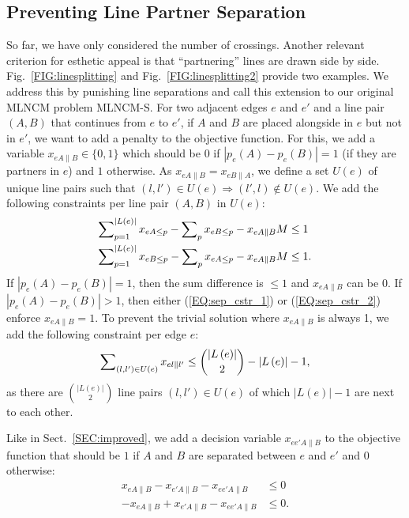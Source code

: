 \documentclass[sigconf]{acmart}
\begin{document}
\subsection{Preventing Line Partner Separation}\label{SEC:separation}

So far, we have only considered the number of crossings.
Another relevant criterion for esthetic appeal is that ``partnering'' lines are drawn side by side.
Fig.~\ref{FIG:linesplitting} and Fig.~\ref{FIG:linesplitting2} provide two examples. We address this by punishing line separations and call this extension to our original MLNCM problem \mbox{MLNCM-S}. For two adjacent edges $e$ and $e'$ and a line pair $(A, B)$ that continues from $e$ to $e'$, if $A$ and $B$ are placed alongside in $e$ but not in $e'$, we want to add a penalty to the objective function. For this, we add a variable $x_{eA\|B} \in \{0, 1\}$ which should be $0$ if $\left|p_{e}(A) - p_{e}(B)\right| = 1$ (if they are partners in $e$) and $1$ otherwise. As $x_{eA\|B} = x_{eB\|A}$, we define a set $U(e)$ of unique line pairs such that $(l, l') \in U(e) \Rightarrow (l', l) \not\in U(e)$. We add the following constraints per line pair $(A, B)$ in $U(e)$:
\begin{align}
	\sum\nolimits_{p=1}^{\left|L\left(e\right)\right|} x_{eA\leq p} - \sum\nolimits_{p} x_{eB\leq p} - x_{eA\|B} M &\leq 1 \label{EQ:sep_cstr_1} \\
	\sum\nolimits_{p=1}^{\left|L\left(e\right)\right|} x_{eB\leq p} - \sum\nolimits_{p} x_{eA\leq p} - x_{eA\|B} M &\leq 1. \label{EQ:sep_cstr_2}
\end{align}
If $|p_{e}(A) - p_{e}(B)| = 1$, then the sum difference is $\leq 1$ and $x_{eA\|B}$ can be 0. If $|p_{e}(A) - p_{e}(B)| > 1$, then either (\ref{EQ:sep_cstr_1}) or (\ref{EQ:sep_cstr_2}) enforce $x_{eA\|B} = 1$. To prevent the trivial solution where $x_{eA\|B}$ is always 1, we add the following constraint per edge $e$:
\begin{align}
	\sum\nolimits_{(l, l') \in U(e)} x_{el\|l'} \leq \binom{\left|L\left(e\right)\right|}{2} - \left|L\left(e\right)\right| - 1,  \label{EQ:sep_cstr_3}
\end{align}
as there are $\binom{\left|L\left(e\right)\right|}{2}$ line pairs $(l, l') \in U(e)$ of which $\left|L\left(e\right)\right| - 1$ are next to each other.

Like in Sect.~\ref{SEC:improved}, we add a decision variable $x_{ee'A\|B}$ to the objective function that should be $1$ if $A$ and $B$ are separated between $e$ and $e'$ and $0$ otherwise:
\begin{align}
	x_{eA\|B} - x_{e'A\|B} - x_{ee'A\|B} &\leq 0 \\
	-x_{eA\|B} + x_{e'A\|B} - x_{ee'A\|B} &\leq 0.
\end{align}
\end{document}
